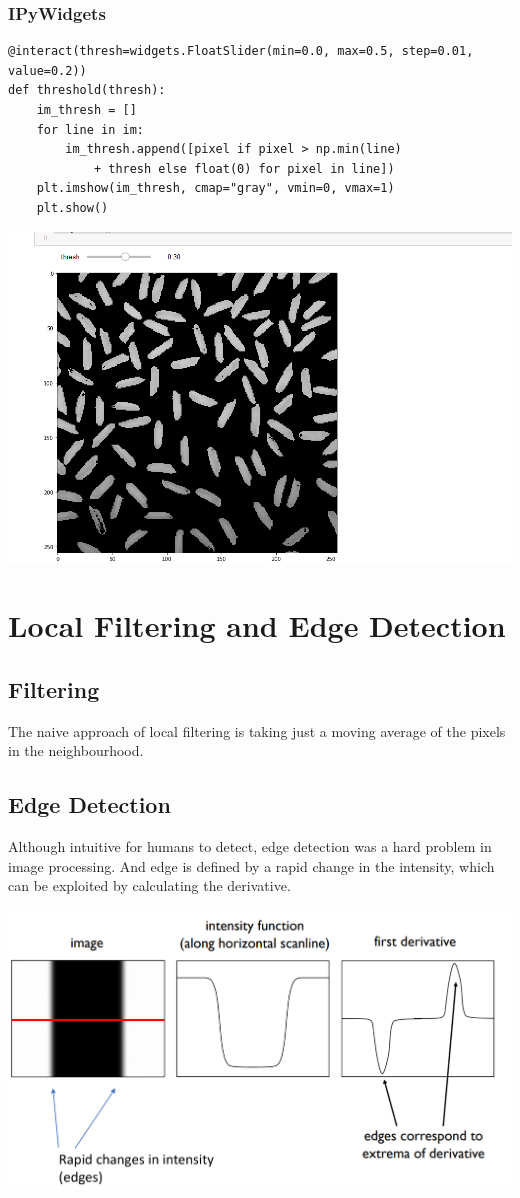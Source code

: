 \documentclass[11pt]{article}
\theoremstyle{definition}
\begin{document}
\subsubsection{IPyWidgets}
\begin{verbatim}
@interact(thresh=widgets.FloatSlider(min=0.0, max=0.5, step=0.01, value=0.2))
def threshold(thresh):
	im_thresh = []
	for line in im:
		im_thresh.append([pixel if pixel > np.min(line) 
			+ thresh else float(0) for pixel in line])
	plt.imshow(im_thresh, cmap="gray", vmin=0, vmax=1)
	plt.show()
\end{verbatim}

\begin{center}
	\includegraphics[width=0.6\linewidth]{img/ipywidgets_example}
\end{center}

\section{Local Filtering and Edge Detection}
\subsection{Filtering}
The naive approach of local filtering is taking just a moving average of the pixels in the neighbourhood.

\subsection{Edge Detection}
Although intuitive for humans to detect, edge detection was a hard problem in image processing. And edge is defined by a rapid change in the intensity, which can be exploited by calculating the derivative.

\begin{center}
	\includegraphics[width=0.6\linewidth]{img/1D_edge_derivative}
\end{center}
\end{document}
